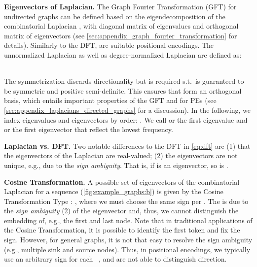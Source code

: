 \documentclass{article}
\newcommand*{\rom}[1]{\uppercase\expandafter{\romannumeral #1\relax}}
\begin{document}
\textbf{Eigenvectors of Laplacian.} The Graph Fourier Transformation (GFT) for undirected graphs  can be defined based on the eigendecomposition of the combinatorial Laplacian , with diagonal matrix  of eigenvalues and orthogonal matrix 
of eigenvectors (see \autoref{sec:appendix_graph_fourier_transformation} for details). Similarly to the DFT,  are suitable positional encodings. The unnormalized Laplacian  as well as degree-normalized Laplacian  are defined as:\\
\begin{minipage}{0.37\linewidth}

\end{minipage}
\begin{minipage}{0.62\linewidth}

\end{minipage}
\vspace{3pt}\\
The symmetrization  discards directionality but is required s.t.\  is guaranteed to be symmetric and positive semi-definite. This ensures that  form an orthogonal basis, which entails important properties of the GFT and for PEs (see \autoref{sec:appendix_laplacians_directed_graphs} for a discussion). In the following, we index eigenvalues and eigenvectors by order: . We call  or  the first eigenvalue and  or  the first eigenvector that reflect the lowest frequency.

\textbf{Laplacian vs. DFT.} Two notable differences to the DFT in \autoref{eq:dft} are (1) that the eigenvectors of the Laplacian are real-valued; (2) the eigenvectors are not unique, e.g., due to the \emph{sign ambiguity}. That is, if  is an eigenvector, so is .

\textbf{Cosine Transformation.} A possible set of eigenvectors of the combinatorial Laplacian for a sequence (\autoref{fig:example_graphs:b}) is given by the Cosine Transformation Type \rom{2} \citep{strang_discrete_1999}: 
, where we must choose the same sign per . The  is due to the \emph{sign ambiguity} (2) of the eigenvector and, thus, we cannot distinguish the embedding of, e.g., the first and last node. Note that in traditional applications of the Cosine Transformation, it is possible to identify the first token and fix the sign. 
However, for general graphs, it is not that easy to resolve the sign ambiguity (e.g., multiple sink and source nodes). Thus, in positional encodings, we typically use an arbitrary sign for each ~\citep{dwivedi_generalization_2021}, and are not able to distinguish direction.
\end{document}
